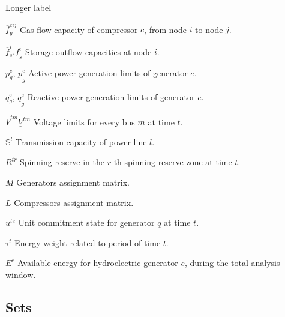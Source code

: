 \begin{labeling}{Longer label\quad}
\item [$\overline{f}^{cij}_{g}$] Gas flow capacity of compressor $c$, from node $i$ to node $j$.
\item [$\overline{f}^{i}_{s}$,$\underline{f}^{i}_{s}$] Storage outflow capacities at node $i$.
\item [$\overline{p}_{g}^{e}$, $\underline{p}_{g}^{e}$] Active power generation limits of generator $e$.
\item [$\overline{q}_{g}^{e}$, $\underline{q}_{g}^{e}$] Reactive power generation limits of generator $e$.
\item [$\overline{V}^{tm} \underline{V}^{tm}$] Voltage limits for every bus $m$ at time $t$.
\item [$\mathbb{S}^{l}$] Transmission capacity of power line $l$.
\item [$R^{tr}$]  Spinning reserve in the $r$-th spinning reserve zone at time $t$.
\item [$M$] Generators assignment matrix.
\item [$L$] Compressors assignment matrix.
\item [$u^{te}$] Unit commitment state for generator $q$ at time $t$.
\item [$\tau^{t}$] Energy weight related to period of time $t$.
\item [$E^{e}$] Available energy for hydroelectric generator $e$, \break during the total analysis window.
\end{labeling}

\subsection*{Sets}

